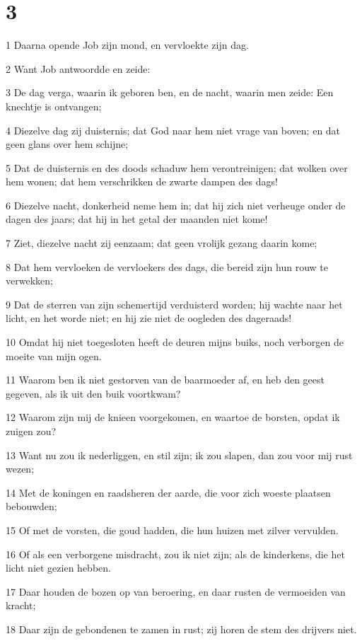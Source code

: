 \chapter{3}

\par 1 Daarna opende Job zijn mond, en vervloekte zijn dag.
\par 2 Want Job antwoordde en zeide:
\par 3 De dag verga, waarin ik geboren ben, en de nacht, waarin men zeide: Een knechtje is ontvangen;
\par 4 Diezelve dag zij duisternis; dat God naar hem niet vrage van boven; en dat geen glans over hem schijne;
\par 5 Dat de duisternis en des doods schaduw hem verontreinigen; dat wolken over hem wonen; dat hem verschrikken de zwarte dampen des dags!
\par 6 Diezelve nacht, donkerheid neme hem in; dat hij zich niet verheuge onder de dagen des jaars; dat hij in het getal der maanden niet kome!
\par 7 Ziet, diezelve nacht zij eenzaam; dat geen vrolijk gezang daarin kome;
\par 8 Dat hem vervloeken de vervloekers des dags, die bereid zijn hun rouw te verwekken;
\par 9 Dat de sterren van zijn schemertijd verduisterd worden; hij wachte naar het licht, en het worde niet; en hij zie niet de oogleden des dageraads!
\par 10 Omdat hij niet toegesloten heeft de deuren mijns buiks, noch verborgen de moeite van mijn ogen.
\par 11 Waarom ben ik niet gestorven van de baarmoeder af, en heb den geest gegeven, als ik uit den buik voortkwam?
\par 12 Waarom zijn mij de knieen voorgekomen, en waartoe de borsten, opdat ik zuigen zou?
\par 13 Want nu zou ik nederliggen, en stil zijn; ik zou slapen, dan zou voor mij rust wezen;
\par 14 Met de koningen en raadsheren der aarde, die voor zich woeste plaatsen bebouwden;
\par 15 Of met de vorsten, die goud hadden, die hun huizen met zilver vervulden.
\par 16 Of als een verborgene misdracht, zou ik niet zijn; als de kinderkens, die het licht niet gezien hebben.
\par 17 Daar houden de bozen op van beroering, en daar rusten de vermoeiden van kracht;
\par 18 Daar zijn de gebondenen te zamen in rust; zij horen de stem des drijvers niet.

